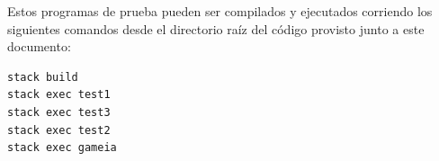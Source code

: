 Estos programas de prueba pueden ser compilados y ejecutados corriendo los siguientes comandos desde el directorio raíz del código provisto junto a este documento:

\begin{lstlisting}[frame=single,language=Haskell]
stack build
stack exec test1
stack exec test3
stack exec test2
stack exec gameia
\end{lstlisting}
